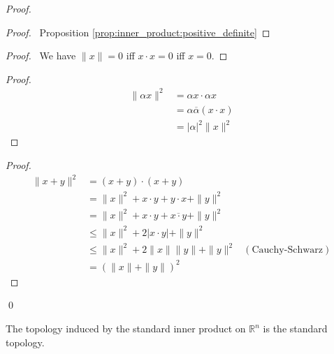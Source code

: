 \begin{proof}
  \pf
  \begin{proof}
    \pf\ Proposition \ref{prop:inner_product:positive_definite}
  \end{proof}
  \begin{proof}
    \pf\ We have $\| x \| = 0$ iff $x \cdot x = 0$ iff $x = 0$.
  \end{proof}
  \begin{proof}
    \pf
    \begin{align*}
      \| \alpha x \|^2
      & = \alpha x \cdot \alpha x \\
      & = \alpha \overline{\alpha} (x \cdot x) \\
      & = |\alpha|^2 \| x \|^2
    \end{align*}
  \end{proof}
  \begin{proof}
    \pf
    \begin{align*}
      \| x + y \|^2 & = (x + y) \cdot (x + y) \\
      & = \| x \| ^2 + x \cdot y + y \cdot x + \| y \|^2 \\
      & = \| x \| ^2 + x \cdot y + \overline{x \cdot y} + \| y \|^2 \\
      & \leq \| x \|^2 + 2 |x \cdot y| + \| y \|^2 \\
      & \leq \| x \|^2 + 2 \| x \| \| y \| + \| y \|^2 & (\text{Cauchy-Schwarz}) \\
      & = (\| x \| + \| y \|)^2
    \end{align*}
  \end{proof}
  \qed
\end{proof}

\begin{prop}
  The topology induced by the standard inner product on $\mathbb{R}^n$ is the standard topology.
\end{prop}

